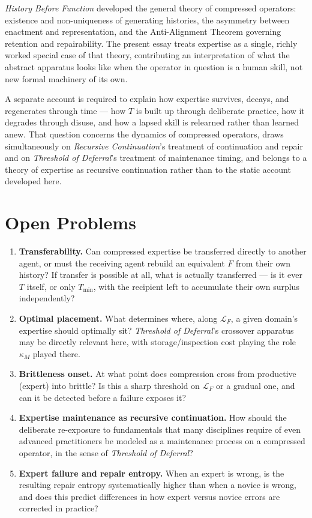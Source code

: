 \documentclass[11pt]{article}
\begin{document}
\emph{History Before Function} developed the general theory of compressed operators: existence and non-uniqueness of generating histories, the asymmetry between enactment and representation, and the Anti-Alignment Theorem governing retention and repairability. The present essay treats expertise as a single, richly worked special case of that theory, contributing an interpretation of what the abstract apparatus looks like when the operator in question is a human skill, not new formal machinery of its own.

A separate account is required to explain how expertise survives, decays, and regenerates through time — how $T$ is built up through deliberate practice, how it degrades through disuse, and how a lapsed skill is relearned rather than learned anew. That question concerns the dynamics of compressed operators, draws simultaneously on \emph{Recursive Continuation}'s treatment of continuation and repair and on \emph{Threshold of Deferral}'s treatment of maintenance timing, and belongs to a theory of expertise as recursive continuation rather than to the static account developed here.

\section*{Open Problems}

\begin{enumerate}
\item \textbf{Transferability.} Can compressed expertise be transferred directly to another agent, or must the receiving agent rebuild an equivalent $F$ from their own history? If transfer is possible at all, what is actually transferred — is it ever $T$ itself, or only $T_{\min}$, with the recipient left to accumulate their own surplus independently?
\item \textbf{Optimal placement.} What determines where, along $\mathcal{L}_F$, a given domain's expertise should optimally sit? \emph{Threshold of Deferral}'s crossover apparatus may be directly relevant here, with storage/inspection cost playing the role $\kappa_M$ played there.
\item \textbf{Brittleness onset.} At what point does compression cross from productive (expert) into brittle? Is this a sharp threshold on $\mathcal{L}_F$ or a gradual one, and can it be detected before a failure exposes it?
\item \textbf{Expertise maintenance as recursive continuation.} How should the deliberate re-exposure to fundamentals that many disciplines require of even advanced practitioners be modeled as a maintenance process on a compressed operator, in the sense of \emph{Threshold of Deferral}?
\item \textbf{Expert failure and repair entropy.} When an expert is wrong, is the resulting repair entropy systematically higher than when a novice is wrong, and does this predict differences in how expert versus novice errors are corrected in practice?
\end{enumerate}
\end{document}
